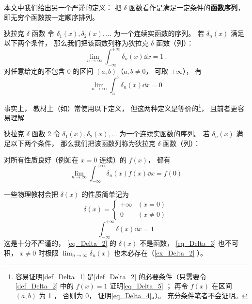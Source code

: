 本文中我们给出另一个严谨的定义： 把 $\delta$ 函数看作是满足一定条件的\textbf{函数序列}， 即无穷个函数按一定顺序排列。
\begin{definition}{狄拉克 $\delta$ 函数}\label{def_Delta_1}
令 $\delta_1(x), \delta_2(x), \dots$ 为一个连续实函数的序列。 若 $\delta_n(x)$ 满足以下两个条件， 那么我们把该函数列称为狄拉克 $\delta$ 函数（列）：
\begin{equation}\label{eq_Delta_5}
\lim_{n\to\infty}\int_{-\infty}^{+\infty} \delta_n(x) \dd{x} = 1~.
\end{equation}
对任意给定的不包含 0 的区间 $(a,b)$（$a,b \ne 0$， 可取 $\pm\infty$）， 有
\begin{equation}\label{eq_Delta_4}
\lim_{n\to\infty} \int_{a}^{b} \delta_n(x) \dd{x} = 0
\end{equation}
\end{definition}
事实上， 教材上（如\cite{Arfken}）常使用以下定义， 但这两种定义是等价的\footnote{容易证明\autoref{def_Delta_1} 是\autoref{def_Delta_2} 的必要条件（只需要令\autoref{def_Delta_2} 中的 $f(x) = 1$ 证明\autoref{eq_Delta_5} ； 再令 $f(x)$ 在区间 $(a,b)$ 为 1 ， 否则为 0， 证明\autoref{eq_Delta_4}。）。 充分条件笔者不会证明。}， 且前者更容易理解

\begin{definition}{狄拉克 $\delta$ 函数 2}\label{def_Delta_2}
令 $\delta_1(x), \delta_2(x), \dots$ 为一个连续实函数的序列。 若 $\delta_n(x)$ 满足以下两个条件， 那么我们把该函数列称为狄拉克 $\delta$ 函数（列）：

对所有性质良好（例如在 $x = 0$ 连续）的 $f(x)$， 都有
\begin{equation}
\lim_{n\to\infty}\int_{-\infty}^{+\infty} \delta_n(x)f(x) \dd{x} = f(0)
\end{equation}
\end{definition}

一些物理教材会把 $\delta(x)$ 的性质简单记为
\begin{equation}\label{eq_Delta_2}
\delta(x) =
\begin{cases}
+\infty & (x = 0)\\
0 & (x \ne 0)
\end{cases}
\end{equation}
\begin{equation}\label{eq_Delta_3}
\int_{-\infty}^{+\infty} \delta(x) \dd{x} = 1
\end{equation}
这是十分不严谨的， \autoref{eq_Delta_2} 的 $\delta(x)$ 不是函数， \autoref{eq_Delta_3} 也不可积， $x \ne 0$ 时极限 $\lim_{n\to \infty}\delta_n(x)$ 也未必存在（\autoref{ex_Delta_2} ）。


